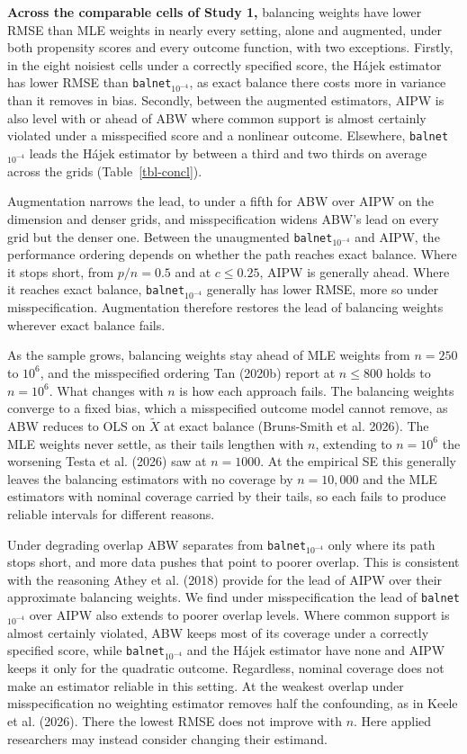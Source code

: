 \documentclass[
  12pt,
  a4paper,
]{article}
\newcounter{none} %
\begin{document}
\textbf{Across the comparable cells of Study 1,} balancing weights have
lower RMSE than MLE weights in nearly every setting, alone and
augmented, under both propensity scores and every outcome function, with
two exceptions. Firstly, in the eight noisiest cells under a correctly
specified score, the Hájek estimator has lower RMSE than
\texttt{balnet}\(_{10^{-4}}\), as exact balance there costs more in
variance than it removes in bias. Secondly, between the augmented
estimators, AIPW is also level with or ahead of ABW where common support
is almost certainly violated under a misspecified score and a nonlinear
outcome. Elsewhere, \texttt{balnet}\(_{10^{-4}}\) leads the Hájek
estimator by between a third and two thirds on average across the grids
(Table~\ref{tbl-concl}).

Augmentation narrows the lead, to under a fifth for ABW over AIPW on the
dimension and denser grids, and misspecification widens ABW's lead on
every grid but the denser one. Between the unaugmented
\texttt{balnet}\(_{10^{-4}}\) and AIPW, the performance ordering depends
on whether the path reaches exact balance. Where it stops short, from
\(p/n = 0.5\) and at \(c \le 0.25\), AIPW is generally ahead. Where it
reaches exact balance, \texttt{balnet}\(_{10^{-4}}\) generally has lower
RMSE, more so under misspecification. Augmentation therefore restores
the lead of balancing weights wherever exact balance fails.

As the sample grows, balancing weights stay ahead of MLE weights from
\(n = 250\) to \(10^6\), and the misspecified ordering Tan (2020b)
report at \(n \le 800\) holds to \(n = 10^6\). What changes with \(n\)
is how each approach fails. The balancing weights converge to a fixed
bias, which a misspecified outcome model cannot remove, as ABW reduces
to OLS on \(\tilde X\) at exact balance (Bruns-Smith et al. 2026). The
MLE weights never settle, as their tails lengthen with \(n\), extending
to \(n = 10^6\) the worsening Testa et al. (2026) saw at \(n = 1000\).
At the empirical SE this generally leaves the balancing estimators with
no coverage by \(n = 10{,}000\) and the MLE estimators with nominal
coverage carried by their tails, so each fails to produce reliable
intervals for different reasons.

Under degrading overlap ABW separates from \texttt{balnet}\(_{10^{-4}}\)
only where its path stops short, and more data pushes that point to
poorer overlap. This is consistent with the reasoning Athey et al.
(2018) provide for the lead of AIPW over their approximate balancing
weights. We find under misspecification the lead of
\texttt{balnet}\(_{10^{-4}}\) over AIPW also extends to poorer overlap
levels. Where common support is almost certainly violated, ABW keeps
most of its coverage under a correctly specified score, while
\texttt{balnet}\(_{10^{-4}}\) and the Hájek estimator have none and AIPW
keeps it only for the quadratic outcome. Regardless, nominal coverage
does not make an estimator reliable in this setting. At the weakest
overlap under misspecification no weighting estimator removes half the
confounding, as in Keele et al. (2026). There the lowest RMSE does not
improve with \(n\). Here applied researchers may instead consider
changing their estimand.
\end{document}
